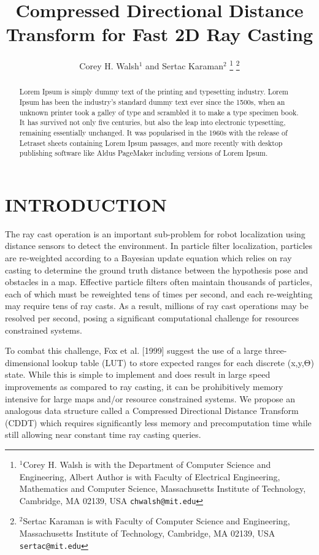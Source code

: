 \documentclass[letterpaper, 10 pt, conference]{ieeeconf}  %
\title{\LARGE \bf
Compressed Directional Distance Transform for Fast 2D Ray Casting
}
\author{Corey H. Walsh$^{1}$ and Sertac Karaman$^{2}$%
\thanks{$^{1}$Corey H. Walsh is with the Department of Computer Science and Engineering, 
Albert Author is with Faculty of Electrical Engineering, Mathematics and Computer Science, Massachusetts Institute of Technology,
        Cambridge, MA 02139, USA
        {\tt\small chwalsh@mit.edu}}%
\thanks{$^{2}$Sertac Karaman is with Faculty of Computer Science and Engineering, Massachusetts Institute of Technology,
        Cambridge, MA 02139, USA
        {\tt\small sertac@mit.edu}}%
}
\begin{document}
\maketitle
\thispagestyle{empty}
\pagestyle{empty}


\begin{abstract}


Lorem Ipsum is simply dummy text of the printing and typesetting industry. Lorem Ipsum has been the industry's standard dummy text ever since the 1500s, when an unknown printer took a galley of type and scrambled it to make a type specimen book. It has survived not only five centuries, but also the leap into electronic typesetting, remaining essentially unchanged. It was popularised in the 1960s with the release of Letraset sheets containing Lorem Ipsum passages, and more recently with desktop publishing software like Aldus PageMaker including versions of Lorem Ipsum.


\end{abstract}


\section{INTRODUCTION}

The ray cast operation is an important sub-problem for robot localization using distance sensors to detect the environment. In particle filter localization, particles are re-weighted according to a Bayesian update equation which relies on ray casting to determine the ground truth distance between the hypothesis pose and obstacles in a map. Effective particle filters often maintain thousands of particles, each of which must be reweighted tens of times per second, and each re-weighting may require tens of ray casts. As a result, millions of ray cast operations may be resolved per second, posing a significant computational challenge for resources constrained systems.

To combat this challenge, Fox et al. [1999] suggest the use of a large three-dimensional lookup table (LUT) to store expected ranges for each discrete (x,y,Θ) state. While this is simple to implement and does result in large speed improvements as compared to ray casting, it can be prohibitively memory intensive for large maps and/or resource constrained systems. We propose an analogous data structure called a Compressed Directional Distance Transform (CDDT) which requires significantly less memory and precomputation time while still allowing near constant time ray casting queries.
\end{document}
